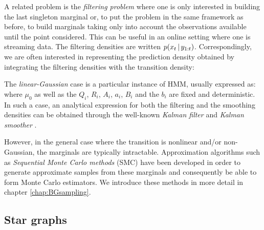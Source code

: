 A related problem is the \emph{filtering problem} where one is only interested in building the last singleton marginal or, to put the problem in the same framework as before, to build marginals taking only into account the observations available until the point considered. This can be useful in an online setting where one is streaming data. 
The filtering densities are written $p(x_t\,|\, y_{1:t})$. Correspondingly, we are often interested in representing the prediction density obtained by integrating the filtering densities with the transition density: 
%
%

The \emph{linear-Gaussian} case is a particular instance of HMM, usually expressed as:
where $\mu_0$ as well as the $Q_i$, $R_i$, $A_i$, $a_i$, $B_i$ and the $b_i$ are fixed and deterministic. In such a case, an analytical expression for both the filtering and the smoothing densities can be obtained through the well-known \emph{Kalman filter} and \emph{Kalman smoother} \citep{anderson79}. 

However, in the general case where the transition is nonlinear and/or non-Gaussian, the marginals are typically intractable. Approximation algorithms such as \emph{Sequential Monte Carlo methods} (SMC) have been developed in order to generate approximate samples from these marginals and consequently be able to form Monte Carlo estimators. We introduce these methods in more detail in chapter \ref{chap:BGsampling}.

\subsection{Star graphs}

